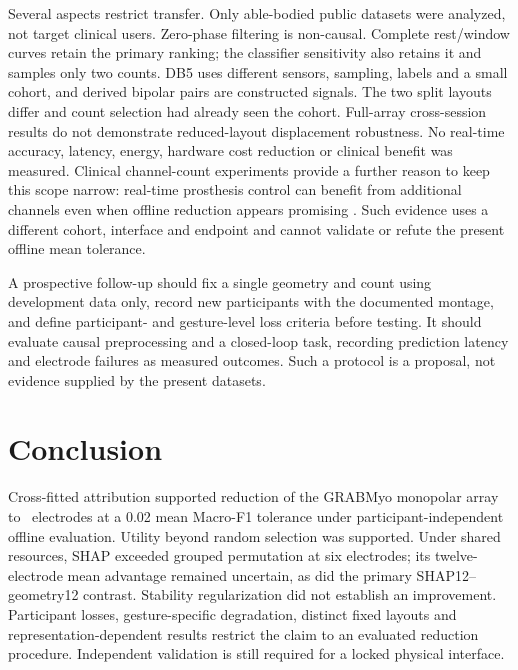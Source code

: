 Several aspects restrict transfer. Only able-bodied public datasets were analyzed, not target clinical users. Zero-phase filtering is non-causal. Complete rest/window curves retain the primary ranking; the classifier sensitivity also retains it and samples only two counts. DB5 uses different sensors, sampling, labels and a small cohort, and derived bipolar pairs are constructed signals. The two split layouts differ and count selection had already seen the cohort. Full-array cross-session results do not demonstrate reduced-layout displacement robustness. No real-time accuracy, latency, energy, hardware cost reduction or clinical benefit was measured. Clinical channel-count experiments provide a further reason to keep this scope narrow: real-time prosthesis control can benefit from additional channels even when offline reduction appears promising \citep{simon2024implications}. Such evidence uses a different cohort, interface and endpoint and cannot validate or refute the present offline mean tolerance.

A prospective follow-up should fix a single geometry and count using development data only, record new participants with the documented montage, and define participant- and gesture-level loss criteria before testing. It should evaluate causal preprocessing and a closed-loop task, recording prediction latency and electrode failures as measured outcomes. Such a protocol is a proposal, not evidence supplied by the present datasets.

\section{Conclusion}
Cross-fitted attribution supported reduction of the GRABMyo monopolar array to \KStarMarginPtTwo\ electrodes at a 0.02 mean Macro-F1 tolerance under participant-independent offline evaluation. Utility beyond random selection was supported. Under shared resources, SHAP exceeded grouped permutation at six electrodes; its twelve-electrode mean advantage remained uncertain, as did the primary SHAP12--geometry12 contrast. Stability regularization did not establish an improvement. Participant losses, gesture-specific degradation, distinct fixed layouts and representation-dependent results restrict the claim to an evaluated reduction procedure. Independent validation is still required for a locked physical interface.
